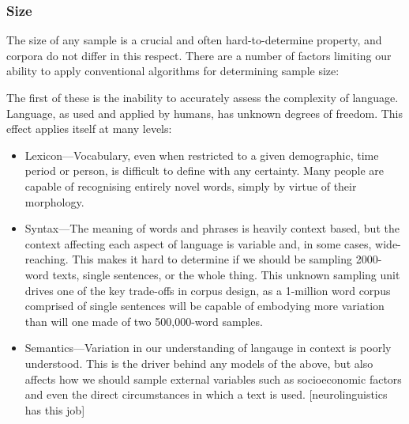


\subsubsection{Size}
The size of any sample is a crucial and often hard-to-determine property, and corpora do not differ in this respect.  There are a number of factors limiting our ability to apply conventional algorithms for determining sample size:

The first of these is the inability to accurately assess the complexity of language.  Language, as used and applied by humans, has unknown degrees of freedom.  This effect applies itself at many levels:

\begin{itemize}
    \item Lexicon---Vocabulary, even when restricted to a given demographic, time period or person, is difficult to define with any certainty.  Many people are capable of recognising entirely novel words, simply by virtue of their morphology.
    \item Syntax---The meaning of words and phrases is heavily context based, but the context affecting each aspect of language is variable and, in some cases, wide-reaching.  This makes it hard to determine if we should be sampling 2000-word texts, single sentences, or the whole thing.  This unknown sampling unit drives one of the key trade-offs in corpus design, as a 1-million word corpus comprised of single sentences will be capable of embodying more variation than will one made of two 500,000-word samples.
    \item Semantics---Variation in our understanding of langauge in context is poorly understood.  This is the driver behind any models of the above, but also affects how we should sample external variables such as socioeconomic factors and even the direct circumstances in which a text is used.  [neurolinguistics has this job]
\end{itemize}

